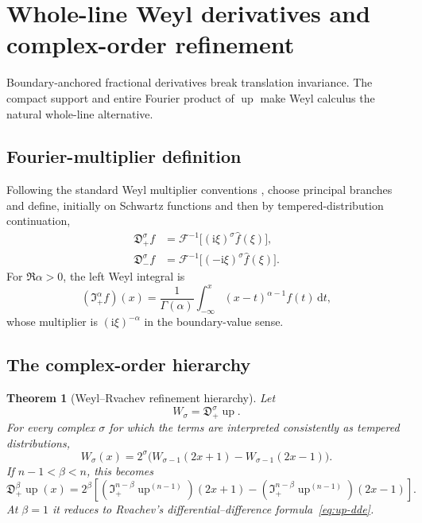 \documentclass[11pt,oneside]{article}
\numberwithin{equation}{section}
\theoremstyle{plain}
\newtheorem{theorem}{Theorem}[section]
\theoremstyle{definition}
\theoremstyle{remark}
\newcommand{\Up}{\operatorname{up}}
\newcommand{\dd}{\,\mathrm d}
\newcommand{\ii}{\mathrm i}
\newcommand{\Four}{\mathcal F}
\begin{document}
\section{Whole-line Weyl derivatives and complex-order refinement}
\label{sec:Weyl}

Boundary-anchored fractional derivatives break translation invariance.  The
compact support and entire Fourier product of $\Up$ make Weyl calculus the
natural whole-line alternative.

\subsection{Fourier-multiplier definition}

Following the standard Weyl multiplier conventions \cite{Samko}, choose
principal branches and define, initially on Schwartz functions and then by
tempered-distribution continuation,
\begin{align}
 \mathfrak D_+^\sigma f
 &=\Four^{-1}\bigl[(\ii\xi)^\sigma\widehat f(\xi)\bigr],
 \label{eq:Weyl-left}\\
 \mathfrak D_-^\sigma f
 &=\Four^{-1}\bigl[(-\ii\xi)^\sigma\widehat f(\xi)\bigr].
 \label{eq:Weyl-right}
\end{align}
For $\Re\alpha>0$, the left Weyl integral is
\begin{equation}
 (\mathfrak I_+^\alpha f)(x)
 =\frac1{\Gamma(\alpha)}
  \int_{-\infty}^x(x-t)^{\alpha-1}f(t)\dd t,
 \label{eq:Weyl-integral}
\end{equation}
whose multiplier is $(\ii\xi)^{-\alpha}$ in the boundary-value sense.

\subsection{The complex-order hierarchy}

\begin{theorem}[Weyl--Rvachev refinement hierarchy]
\label{thm:Weyl-hierarchy}
Let
\begin{equation}
 W_\sigma=\mathfrak D_+^\sigma\Up.
 \label{eq:W-sigma}
\end{equation}
For every complex $\sigma$ for which the terms are interpreted consistently
as tempered distributions,
\begin{equation}
 W_\sigma(x)=2^\sigma
 \bigl(W_{\sigma-1}(2x+1)-W_{\sigma-1}(2x-1)\bigr).
 \label{eq:Weyl-refinement}
\end{equation}
If $n-1<\beta<n$, this becomes
\begin{equation}
 \mathfrak D_+^\beta\Up(x)
 =2^\beta\left[
  (\mathfrak I_+^{n-\beta}\Up^{(n-1)})(2x+1)
 -(\mathfrak I_+^{n-\beta}\Up^{(n-1)})(2x-1)
 \right].
 \label{eq:Weyl-real-order}
\end{equation}
At $\beta=1$ it reduces to Rvachev's differential--difference
formula~\eqref{eq:up-dde}.
\end{theorem}
\end{document}
